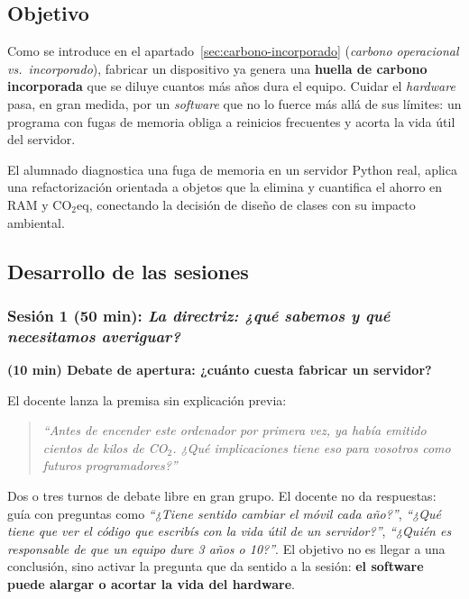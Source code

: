 \subsection{Objetivo}


Como se introduce en el apartado~\ref{sec:carbono-incorporado} (\textit{carbono operacional vs.\ incorporado}), fabricar un dispositivo ya genera una \textbf{huella de carbono incorporada} que se diluye cuantos más años dura el equipo. Cuidar el \textit{hardware} pasa, en gran medida, por un \textit{software} que no lo fuerce más allá de sus límites: un programa con fugas de memoria obliga a reinicios frecuentes y acorta la vida útil del servidor.

El alumnado diagnostica una fuga de memoria en un servidor Python real, aplica una refactorización orientada a objetos que la elimina y cuantifica el ahorro en RAM y CO$_2$eq, conectando la decisión de diseño de clases con su impacto ambiental.


\subsection{Desarrollo de las sesiones}


\subsubsection{Sesión 1 (50 min): \textit{La directriz: ¿qué sabemos y qué necesitamos averiguar?}}


\textbf{(10 min) Debate de apertura: ¿cuánto cuesta fabricar un servidor?}


El docente lanza la premisa sin explicación previa:

\begin{quote}
\textit{``Antes de encender este ordenador por primera vez, ya había emitido cientos de kilos de CO$_2$. ¿Qué implicaciones tiene eso para vosotros como futuros programadores?''}
\end{quote}

Dos o tres turnos de debate libre en gran grupo. El docente no da respuestas: guía con preguntas como \textit{``¿Tiene sentido cambiar el móvil cada año?''}, \textit{``¿Qué tiene que ver el código que escribís con la vida útil de un servidor?''}, \textit{``¿Quién es responsable de que un equipo dure 3 años o 10?''}. El objetivo no es llegar a una conclusión, sino activar la pregunta que da sentido a la sesión: \textbf{el software puede alargar o acortar la vida del hardware}.


